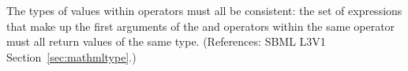 The types of values within  operators must all
be consistent: the set of expressions that make up the first
arguments of the  and  operators
within the same  operator must all return
values of the same type.  (References: SBML L3V1
Section~\ref{sec:mathmltype}.) 
